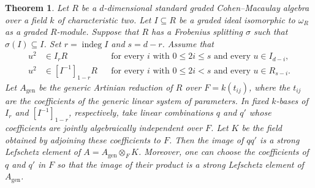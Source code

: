 \documentclass[a4paper,11pt]{amsart}
\DeclareMathOperator{\indeg}{indeg}
\newcommand{\kk}{k}
\newtheorem{theorem}{Theorem}[section]
\theoremstyle{definition}
\begin{document}
\begin{theorem}\label{thm:split-strong-lefschetz}
Let $R$ be a $d$-dimensional standard graded Cohen--Macaulay algebra over a field $\kk$ of characteristic two. Let $I\subseteq R$ be a graded ideal isomorphic to $\omega_R$ as a graded $R$-module. Suppose that $R$ has a Frobenius splitting $\sigma$ such that $\sigma(I)\subseteq I$. Set $r=\indeg I$ and $s=d-r$. Assume that
\[
\begin{aligned}
u^2&\in I_rR &&\text{for every $i$ with $0\leq 2i\leq s$ and every $u\in I_{d-i}$},\\
u^2&\in[I^{-1}]_{1-r}R &&\text{for every $i$ with $0\leq 2i<s$ and every $u\in R_{s-i}$}.
\end{aligned}
\]
Let $A_{\mathrm{gen}}$ be the generic Artinian reduction of $R$ over $F=\kk(t_{ij})$, where the $t_{ij}$ are the coefficients of the generic linear system of parameters. In fixed $\kk$-bases of $I_r$ and $[I^{-1}]_{1-r}$, respectively, take linear combinations $q$ and $q'$ whose coefficients are jointly algebraically independent over $F$. Let $K$ be the field obtained by adjoining these coefficients to $F$. Then the image of $qq'$ is a strong Lefschetz element of $A=A_{\mathrm{gen}}\otimes_F K$. Moreover, one can choose the coefficients of $q$ and $q'$ in $F$ so that the image of their product is a strong Lefschetz element of $A_{\mathrm{gen}}$.
\end{theorem}
\end{document}
